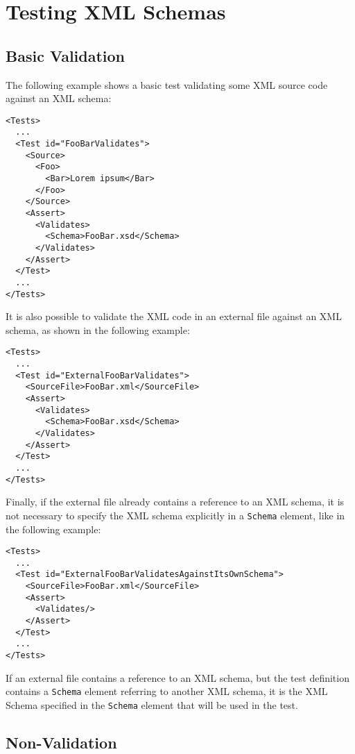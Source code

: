 %

\chapter{Testing XML Schemas}

\section{Basic Validation}

The following example shows a basic test validating some XML source code against an XML schema:
\begin{verbatim}
<Tests>
  ...
  <Test id="FooBarValidates">
    <Source>
      <Foo>
        <Bar>Lorem ipsum</Bar>
      </Foo>
    </Source>
    <Assert>
      <Validates>
        <Schema>FooBar.xsd</Schema>
      </Validates>
    </Assert>
  </Test>
  ...
</Tests>
\end{verbatim}

It is also possible to validate the XML code in an external file against an XML schema, as shown in the following example:
\begin{verbatim}
<Tests>
  ...
  <Test id="ExternalFooBarValidates">
    <SourceFile>FooBar.xml</SourceFile>
    <Assert>
      <Validates>
        <Schema>FooBar.xsd</Schema>
      </Validates>
    </Assert>
  </Test>
  ...
</Tests>
\end{verbatim}

Finally, if the external file already contains a reference to an XML schema, it is not necessary to specify the XML schema explicitly in a {\tt Schema} element, like in the following example:
\begin{verbatim}
<Tests>
  ...
  <Test id="ExternalFooBarValidatesAgainstItsOwnSchema">
    <SourceFile>FooBar.xml</SourceFile>
    <Assert>
      <Validates/>
    </Assert>
  </Test>
  ...
</Tests>
\end{verbatim}

If an external file contains a reference to an XML schema, but the test definition contains a {\tt Schema} element referring to another XML schema, it is the XML Schema specified in the {\tt Schema} element that will be used in the test.

\section{Non-Validation}

